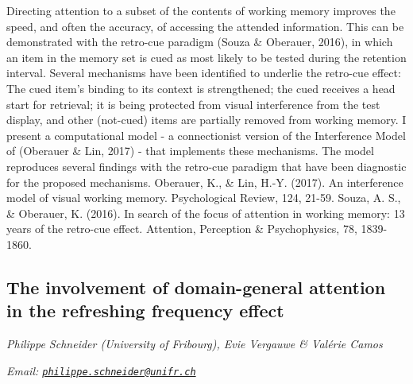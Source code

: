 \documentclass[
  12pt,
]{book}
\begin{document}
Directing attention to a subset of the contents of working memory improves the speed, and often the accuracy, of accessing the attended information. This can be demonstrated with the retro-cue paradigm (Souza \& Oberauer, 2016), in which an item in the memory set is cued as most likely to be tested during the retention interval. Several mechanisms have been identified to underlie the retro-cue effect: The cued item's binding to its context is strengthened; the cued receives a head start for retrieval; it is being protected from visual interference from the test display, and other (not-cued) items are partially removed from working memory. I present a computational model - a connectionist version of the Interference Model of (Oberauer \& Lin, 2017) - that implements these mechanisms. The model reproduces several findings with the retro-cue paradigm that have been diagnostic for the proposed mechanisms.
Oberauer, K., \& Lin, H.-Y. (2017). An interference model of visual working memory. Psychological Review, 124, 21-59.
Souza, A. S., \& Oberauer, K. (2016). In search of the focus of attention in working memory: 13 years of the retro-cue effect. Attention, Perception \& Psychophysics, 78, 1839-1860.

\hypertarget{the-involvement-of-domain-general-attention-in-the-refreshing-frequency-effect}{%
\subsection{The involvement of domain-general attention in the refreshing frequency effect}\label{the-involvement-of-domain-general-attention-in-the-refreshing-frequency-effect}}

\emph{Philippe Schneider (University of Fribourg), Evie Vergauwe \& Valérie Camos}

\emph{Email: \href{mailto:philippe.schneider@unifr.ch}{\nolinkurl{philippe.schneider@unifr.ch}}}
\end{document}
